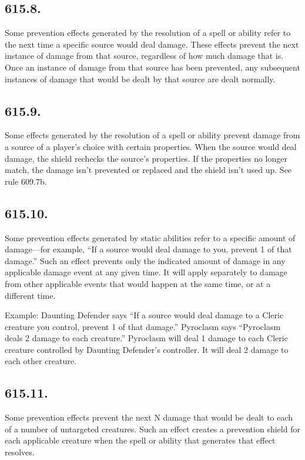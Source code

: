\subsection*{615.8.}
Some prevention effects generated by the resolution of a spell or ability refer to the next time a specific source would deal damage. These effects prevent the next instance of damage from that source, regardless of how much damage that is. Once an instance of damage from that source has been prevented, any subsequent instances of damage that would be dealt by that source are dealt normally.

\subsection*{615.9.}
Some effects generated by the resolution of a spell or ability prevent damage from a source of a player’s choice with certain properties. When the source would deal damage, the shield rechecks the source’s properties. If the properties no longer match, the damage isn’t prevented or replaced and the shield isn’t used up. See rule 609.7b.

\subsection*{615.10.}
Some prevention effects generated by static abilities refer to a specific amount of damage—for example, “If a source would deal damage to you, prevent 1 of that damage.” Such an effect prevents only the indicated amount of damage in any applicable damage event at any given time. It will apply separately to damage from other applicable events that would happen at the same time, or at a different time.

Example: Daunting Defender says “If a source would deal damage to a Cleric creature you control, prevent 1 of that damage.” Pyroclasm says “Pyroclasm deals 2 damage to each creature.” Pyroclasm will deal 1 damage to each Cleric creature controlled by Daunting Defender’s controller. It will deal 2 damage to each other creature.

\subsection*{615.11.}
Some prevention effects prevent the next N damage that would be dealt to each of a number of untargeted creatures. Such an effect creates a prevention shield for each applicable creature when the spell or ability that generates that effect resolves.

